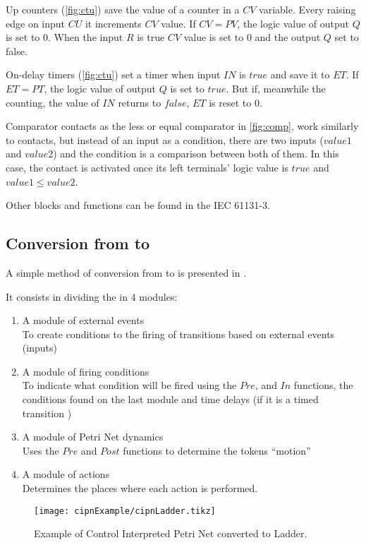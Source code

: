 Up counters (\autoref{fig:ctu}) save the value of a counter in a $CV$ variable. Every raising edge
on input $CU$ it increments $CV$ value. If $CV=PV$, the logic value of output $Q$ 
is set to $0$. When the input $R$ is true $CV$ value is set to $0$ and the
output $Q$ set to false.

On-delay timers (\autoref{fig:ctu}) set a timer when input $IN$ is $true$
and save it to $ET$. If $ET=PT$, the logic value of output $Q$ is set to $true$.
But if, meanwhile the counting, the value of $IN$ returns to $false$, $ET$ is reset to
$0$.

Comparator contacts as the less or equal comparator in \autoref{fig:comp}, work
similarly to contacts, but instead of an input as a condition, there are two
inputs ($value1$ and $value2$) and the condition is a comparison between both of
them. In this case, the contact is activated once its left terminals' logic
value is $true$ and $value1\leq value2$.

Other blocks and functions can be found in the IEC 61131-3.

\subsection{Conversion from \CIPN{} to \LD}
\label{sec:cipnToLD}

A simple method of conversion from \CIPN{} to \LD is presented in
\cite{moreira2013bridging}.

It consists in dividing the \CIPN{} in 4 modules:
\begin{enumerate}
\item A module of external events\\
  To create conditions to the firing of transitions based on external events
  (inputs)
\item A module of firing conditions\\
  To indicate what condition will be fired using the $Pre$, and $In$ functions, the conditions found on the
  last module and time delays (if it is a timed transition 
  )
\item A module of Petri Net dynamics\\
Uses the $Pre$ and $Post$ functions to determine the tokens ``motion''
\item A module of actions\\
  Determines the places where each action is performed.
\end{enumerate}


\begin{figure}[H]
  \centering \texttt{[image: cipnExample/cipnLadder.tikz]}
  \caption[cipnexample]{Example of Control Interpreted Petri Net converted to
    Ladder.}
  \label{fig:cipnexampleLadder}
\end{figure}



